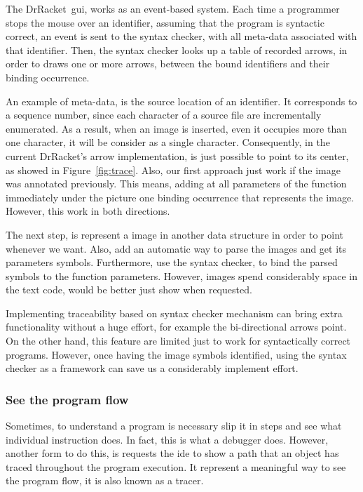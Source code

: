 The DrRacket~\ac{gui}, works as an event-based system. Each time a programmer stops the mouse over an identifier, assuming that the program is syntactic correct, an event is sent to the syntax checker, with all meta-data associated with that identifier. Then, the syntax checker looks up a table of recorded arrows, in order to draws one or more arrows, between the bound identifiers and their binding occurrence. 

An example of meta-data, is the source location of an identifier. It corresponds to a sequence number, since each character of a source file are incrementally enumerated. As a result, when an image is inserted, even it occupies more than one character, it will be consider as a single character. Consequently, in the current DrRacket's arrow implementation, is just possible to point to its center, as showed in Figure~\ref{fig:trace}. Also, our first approach just work if the image was annotated previously. This means, adding at all parameters of the function immediately under the picture one binding occurrence that represents the image. However, this work in both directions.

The next step, is represent a image in another data structure in order to point whenever we want. Also, add an automatic way to parse the images and get its parameters symbols. Furthermore, use the syntax checker, to bind the parsed symbols to the function parameters. However, images spend considerably space in the text code, would be better just show when requested. 

Implementing traceability based on syntax checker mechanism can bring extra functionality without a huge effort, for example the bi-directional arrows point. On the other hand, this feature are limited just to work for syntactically correct programs. However, once having the image symbols identified, using the syntax checker as a framework can save us a considerably implement effort. 

\subsubsection{See the program flow}

Sometimes, to understand a program is necessary slip it in steps and see what individual instruction does. In fact, this is what a debugger does. However, another form to do this, is requests the \ac{ide} to show a path that an object has traced throughout the program execution. It represent a meaningful way to see the program flow, it is also known as a tracer.


